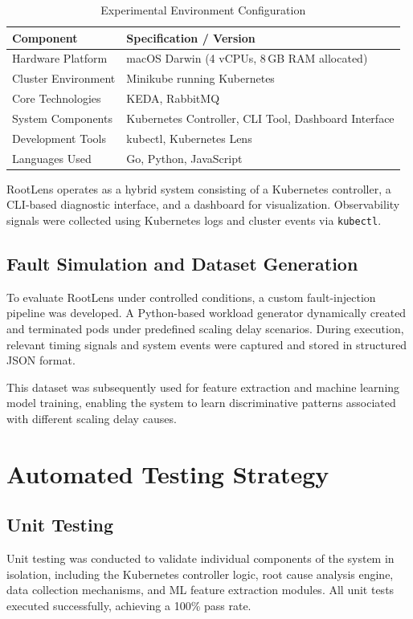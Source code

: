 \begin{table}[H]
\centering
\begin{tabularx}{\textwidth}{|l|X|}
\hline
\textbf{Component} & \textbf{Specification / Version} \\ \hline
Hardware Platform & macOS Darwin (4 vCPUs, 8\,GB RAM allocated) \\ \hline
Cluster Environment & Minikube running Kubernetes \\ \hline
Core Technologies & KEDA, RabbitMQ \\ \hline
System Components & Kubernetes Controller, CLI Tool, Dashboard Interface \\ \hline
Development Tools & kubectl, Kubernetes Lens \\ \hline
Languages Used & Go, Python, JavaScript \\ \hline
\end{tabularx}
\caption{Experimental Environment Configuration}
\label{tab:test_env}
\end{table}

RootLens operates as a hybrid system consisting of a Kubernetes controller, a CLI-based diagnostic interface, and a dashboard for visualization. Observability signals were collected using Kubernetes logs and cluster events via \texttt{kubectl}.

\subsection{Fault Simulation and Dataset Generation}
To evaluate RootLens under controlled conditions, a custom fault-injection pipeline was developed. A Python-based workload generator dynamically created and terminated pods under predefined scaling delay scenarios. During execution, relevant timing signals and system events were captured and stored in structured JSON format.

This dataset was subsequently used for feature extraction and machine learning model training, enabling the system to learn discriminative patterns associated with different scaling delay causes.

\section{Automated Testing Strategy}

\subsection{Unit Testing}
Unit testing was conducted to validate individual components of the system in isolation, including the Kubernetes controller logic, root cause analysis engine, data collection mechanisms, and ML feature extraction modules. All unit tests executed successfully, achieving a 100\% pass rate.

